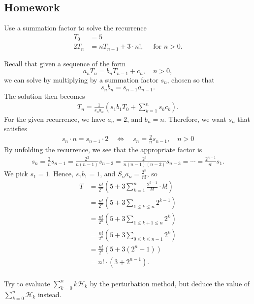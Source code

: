 \documentclass[12pt]{article}
\newenvironment{ex}[2][Exercise]{\begin{trivlist}
		\item[\hskip \labelsep {\bfseries #1}\hskip \labelsep {\bfseries #2.}]}{\end{trivlist}}
\newenvironment{sol}[1][Solution]{\begin{trivlist}
		\item[\hskip \labelsep {\bfseries #1:}]}{\end{trivlist}}
\begin{document}
\subsection*{Homework}

\begin{ex}{19}
	Use a summation factor to solve the recurrence
	\begin{align*}
		 T_0&=5\\
		2T_n&=nT_{n-1}+3\cdot n!,\quad \text{ for } n>0.
	\end{align*}
\end{ex}

\begin{sol}
	Recall that given a sequence of the form
	\[
	a_nT_n=b_nT_{n-1}+c_n,\quad n>0,
	\]
	we can solve by multiplying by a summation factor $s_n$, chosen
	so that 
	\[
	s_nb_n=s_{n-1}a_{n-1}.
	\]
	The solution then becomes
	\begin{align*}
		T_n=\frac{1}{s_na_n}\left(s_1b_1T_0+\sum_{k=1}^{n}s_kc_k\right).
	\end{align*}
	For the given recurrence, we have $a_n=2$, and $b_n=n$. Therefore,
	we want $s_n$ that satisfies
	\begin{align*}
		s_n\cdot n=s_{n-1}\cdot2
		\quad\iff\quad
		s_n=\frac{2}{n}s_{n-1},\quad n>0
	\end{align*}
	By unfolding the recurrence, we see that the appropriate factor is
	\begin{align*}
		s_n=\frac{2}{n}s_{n-1}
		=\frac{2^2}{n(n-1)}s_{n-2}
		=\frac{2^3}{n(n-1)(n-2)}s_{n-3}=\cdots
		=\frac{2^{n-1}}{n!}s_1.
	\end{align*}
	We pick $s_1=1$. Hence, $s_1b_1=1$, and $S_na_n=\frac{2^{n}}{n!}$, so
	\begin{align*}
		T&=\frac{n!}{2^{n}}\left(5+3\sum_{k=1}^{n}\frac{2^{k-1}}{k!}\cdot k!\right)\\
		&=\frac{n!}{2^{n}}\left(5+3\sum_{1\leq k\leq n}2^{k-1}\right)\\
		&=\frac{n!}{2^{n}}\left(5+3\sum_{1\leq k+1\leq n}2^{k}\right)\\
		&=\frac{n!}{2^{n}}\left(5+3\sum_{0\leq k\leq n-1}2^{k}\right)\\
		&=\frac{n!}{2^n}\left(5+3(2^{n}-1) \right)\\
		&=n!\cdot (3+2^{n-1}).\\
	\end{align*}
\end{sol}

\begin{ex}{20}
	Try to evaluate $\sum_{k=0}^{n}k\mathcal{H}_k$ by the perturbation method, but deduce the
	value of $\sum_{k=0}^{n}\mathcal{H}_k$ instead.
\end{ex}
\end{document}
